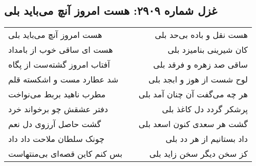 \begin{center}
\section*{غزل شماره ۲۹۰۹: هست امروز آنچ می‌باید بلی}
\label{sec:2909}
\begin{longtable}{l p{0.5cm} r}
هست امروز آنچ می‌باید بلی
&&
هست نقل و باده بی‌حد بلی
\\
هست ای ساقی خوب از بامداد
&&
کان شیرینی بنامیزد بلی
\\
آفتاب امروز گشته‌ست از پگاه
&&
ساقی صد زهره و فرقد بلی
\\
شد عطارد مست و اشکسته قلم
&&
لوح شست از هوز و ابجد بلی
\\
مطرب ناهید بربط می‌نواخت
&&
هر چه می‌گفت آن چنان آمد بلی
\\
دفتر عشقش چو برخواند خرد
&&
پرشکر گردد دل کاغذ بلی
\\
گشت حاصل آرزوی دل نعم
&&
گشت هر سعدی کنون اسعد بلی
\\
چونک سلطان ملاحت داد داد
&&
داد بستانیم از هر دد بلی
\\
بس کنم کاین قصه‌ای بی‌منتهاست
&&
کز سخن دیگر سخن زاید بلی
\\
\end{longtable}
\end{center}
